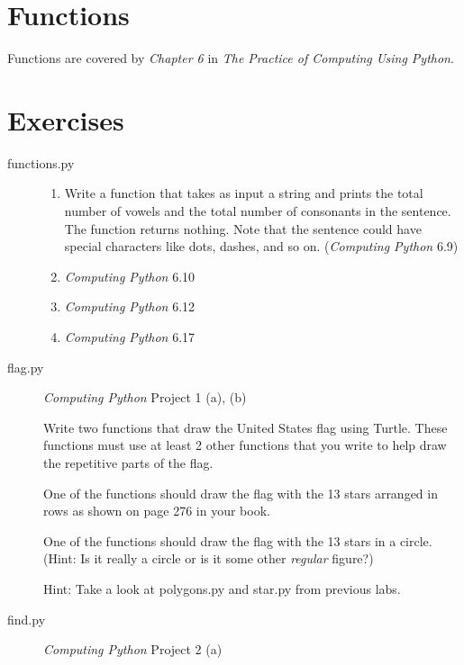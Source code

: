 \documentclass[11pt]{cselabheader}
\begin{document}
\section{Functions}

Functions are covered by \emph{Chapter 6} in \emph{The Practice of Computing
  Using Python}.

\section{Exercises}
\label{sec:ex}

\begin{description}
\item[functions.py] \hfill
  
  \begin{enumerate}
  \item Write a function that takes as input a string and prints the total
    number of vowels and the total number of consonants in the sentence. The
    function returns nothing. Note that the sentence could have special
    characters like dots, dashes, and so on. (\emph{Computing Python} 6.9)

  \item \emph{Computing Python} 6.10
  \item \emph{Computing Python} 6.12

  \item \emph{Computing Python} 6.17
  \end{enumerate}

\item[flag.py] \emph{Computing Python} Project 1 (a), (b) \hfill

  Write two functions that draw the United States flag using Turtle.
  These functions must use at least 2 other functions that you write
  to help draw the repetitive parts of the flag.

  One of the functions should draw the flag with the 13 stars arranged
  in rows as shown on page 276 in your book.

  One of the functions should draw the flag with the 13 stars in a circle.
  (Hint: Is it really a circle or is it some other \emph{regular} figure?)
  
  Hint: Take a look at polygons.py and star.py from previous labs.

\item[find.py] \emph{Computing Python} Project 2 (a)


\end{description}
\end{document}
